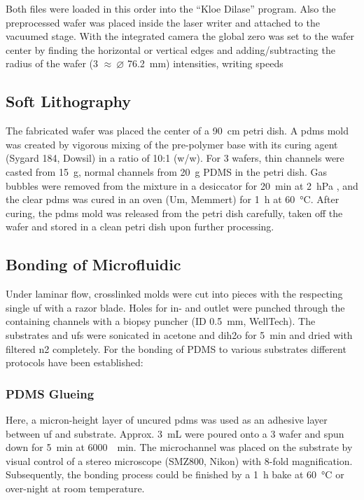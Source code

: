 Both files were loaded in this order into the ``Kloe Dilase'' program. Also the preprocessed wafer was placed inside the laser writer and attached to the vacuumed stage. With the integrated camera the global zero was set to the wafer center by finding the horizontal or vertical edges and adding/subtracting the radius of the wafer (\SI{3}{\inch} $\approx\ \varnothing $  \SI{76.2}{\milli\meter}) intensities, writing speeds 


\subsection{Soft Lithography}
The fabricated wafer was placed the center of a \SI{90}{\centi\meter} petri dish. A \gls{pdms} mold was created by vigorous mixing of the pre-polymer base with its curing agent (Sygard 184, Dowsil) in a ratio of 10:1 (w/w). For \SI{3}{\inch} wafers, thin channels were casted from \SI{15}{\gram}, normal channels from \SI{20}{\gram} PDMS in the petri dish. Gas bubbles were removed from the mixture in a desiccator for \SI{20}{\minute} at \SI{2}{\hecto\pascal} , and the clear \gls{pdms} was cured in an oven (Um, Memmert) for \SI{1}{\hour} at \SI{60}{\degreeCelsius}. After curing, the \gls{pdms} mold was released from the petri dish carefully, taken off the wafer and stored in a clean petri dish upon further processing.  

\subsection{Bonding of Microfluidic}
Under laminar flow, crosslinked molds were cut into pieces with the respecting single \gls{uf} with a razor blade. Holes for in- and outlet were punched through the containing channels with a biopsy puncher (ID \SI{0.5}{\milli\meter}, WellTech). The substrates and \glspl{uf} were sonicated in acetone and \gls{dih2o} for \SI{5}{\minute} and dried with filtered \gls{n2} completely. For the bonding of PDMS to various substrates different protocols have been established:

\subsubsection{PDMS Glueing}
Here, a micron-height layer of uncured \gls{pdms} was used as an adhesive layer between \gls{uf} and substrate. Approx. \SI{3}{\milli\liter} were poured onto a \SI{3}{\inch} wafer and spun down for \SI{5}{\minute} at \SI{6000}{\per\minute}. The microchannel was placed on the substrate by visual control of a stereo microscope (SMZ800, Nikon) with 8-fold magnification. Subsequently, the bonding process could be finished by a \SI{1}{\hour} bake at \SI{60}{\degreeCelsius} or over-night at room temperature.

